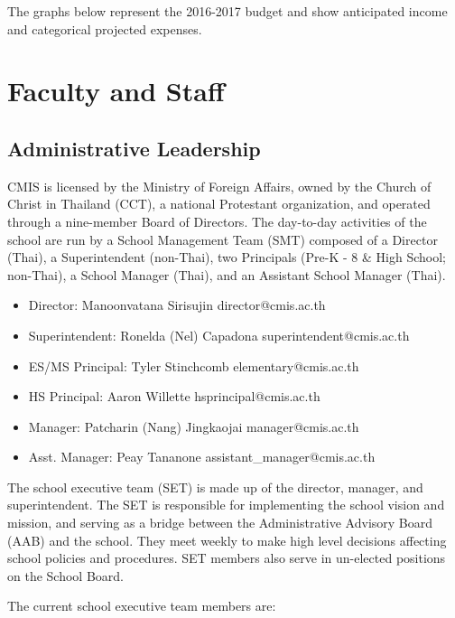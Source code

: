
The graphs below represent the 2016-2017 budget and show anticipated income and categorical projected expenses.  


\section{Faculty and Staff}

\subsection{Administrative Leadership}

CMIS is licensed by the Ministry of Foreign Affairs, owned by the Church of Christ in Thailand (CCT), a national Protestant organization, and operated through a nine-member Board of Directors.  The day-to-day activities of the school are run by a School Management Team (SMT) composed of a Director (Thai), a Superintendent (non-Thai), two Principals (Pre-K - 8 \& High School; non-Thai), a School Manager (Thai), and an Assistant School Manager (Thai). 

\begin{itemize}
\item Director:  Manoonvatana Sirisujin         		director@cmis.ac.th
\item Superintendent:  Ronelda (Nel) Capadona	superintendent@cmis.ac.th
\item ES/MS Principal:  Tyler Stinchcomb	     	elementary@cmis.ac.th
\item HS Principal:  Aaron Willette		   	hsprincipal@cmis.ac.th	
\item Manager:  Patcharin (Nang) Jingkaojai		manager@cmis.ac.th
\item Asst. Manager:  Peay Tananone			assistant\_manager@cmis.ac.th
\end{itemize}


The school executive team (SET) is made up of the director, manager, and superintendent. The SET is responsible for implementing the school vision and mission, and serving as a bridge between the Administrative Advisory Board (AAB) and the school.  They meet weekly to make high level decisions affecting school policies and procedures.  SET members also serve in un-elected positions on the School Board.  

The current school executive team members are:

